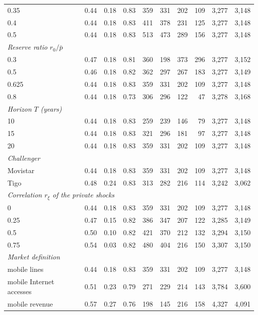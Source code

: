 \begin{tabular}{lrrrrrrrrr}
0.35 & 0.44 & 0.18 & 0.83 & 359 & 331 & 202 & 109 & 3,277 & 3,148 \\
0.4 & 0.44 & 0.18 & 0.83 & 411 & 378 & 231 & 125 & 3,277 & 3,148 \\
0.5 & 0.44 & 0.18 & 0.83 & 513 & 473 & 289 & 156 & 3,277 & 3,148 \\
\midrule
\multicolumn{10}{l}{\textit{Reserve ratio $r_0/\bar p$}} \\
0.3 & 0.47 & 0.18 & 0.81 & 360 & 198 & 373 & 296 & 3,277 & 3,152 \\
0.5 & 0.46 & 0.18 & 0.82 & 362 & 297 & 267 & 183 & 3,277 & 3,149 \\
0.625 & 0.44 & 0.18 & 0.83 & 359 & 331 & 202 & 109 & 3,277 & 3,148 \\
0.8 & 0.44 & 0.18 & 0.73 & 306 & 296 & 122 & 47 & 3,278 & 3,168 \\
\midrule
\multicolumn{10}{l}{\textit{Horizon $T$ (years)}} \\
10 & 0.44 & 0.18 & 0.83 & 259 & 239 & 146 & 79 & 3,277 & 3,148 \\
15 & 0.44 & 0.18 & 0.83 & 321 & 296 & 181 & 97 & 3,277 & 3,148 \\
20 & 0.44 & 0.18 & 0.83 & 359 & 331 & 202 & 109 & 3,277 & 3,148 \\
\midrule
\multicolumn{10}{l}{\textit{Challenger}} \\
Movistar & 0.44 & 0.18 & 0.83 & 359 & 331 & 202 & 109 & 3,277 & 3,148 \\
Tigo & 0.48 & 0.24 & 0.83 & 313 & 282 & 216 & 114 & 3,242 & 3,062 \\
\midrule
\multicolumn{10}{l}{\textit{Correlation $r_\xi$ of the private shocks}} \\
0 & 0.44 & 0.18 & 0.83 & 359 & 331 & 202 & 109 & 3,277 & 3,148 \\
0.25 & 0.47 & 0.15 & 0.82 & 386 & 347 & 207 & 122 & 3,285 & 3,149 \\
0.5 & 0.50 & 0.10 & 0.82 & 421 & 370 & 212 & 132 & 3,294 & 3,150 \\
0.75 & 0.54 & 0.03 & 0.82 & 480 & 404 & 216 & 150 & 3,307 & 3,150 \\
\midrule
\multicolumn{10}{l}{\textit{Market definition}} \\
mobile lines & 0.44 & 0.18 & 0.83 & 359 & 331 & 202 & 109 & 3,277 & 3,148 \\
mobile Internet accesses & 0.51 & 0.23 & 0.79 & 271 & 229 & 214 & 143 & 3,784 & 3,600 \\
mobile revenue & 0.57 & 0.27 & 0.76 & 198 & 145 & 216 & 158 & 4,327 & 4,091 \\
\bottomrule
\end{tabular}
